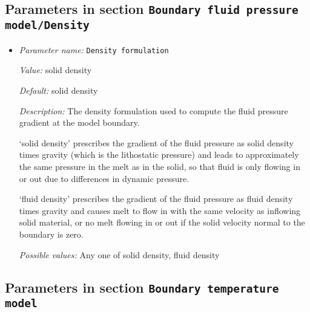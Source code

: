 \subsection{Parameters in section \tt Boundary fluid pressure model/Density}
\label{parameters:Boundary_20fluid_20pressure_20model/Density}

\begin{itemize}
\item {\it Parameter name:} {\tt Density formulation}
\label{parameters:Boundary fluid pressure model/Density/Density formulation}


{\it Value:} solid density


{\it Default:} solid density


{\it Description:} The density formulation used to compute the fluid pressure gradient at the model boundary.

`solid density' prescribes the gradient of the fluid pressure as solid density times gravity (which is the lithostatic pressure) and leads to approximately the same pressure in the melt as in the solid, so that fluid is only flowing in or out due to differences in dynamic pressure.

`fluid density' prescribes the gradient of the fluid pressure as fluid density times gravity and causes melt to flow in with the same velocity as inflowing solid material, or no melt flowing in or out if the solid velocity normal to the boundary is zero.


{\it Possible values:} Any one of solid density, fluid density
\end{itemize}

\subsection{Parameters in section \tt Boundary temperature model}
\label{parameters:Boundary_20temperature_20model}

